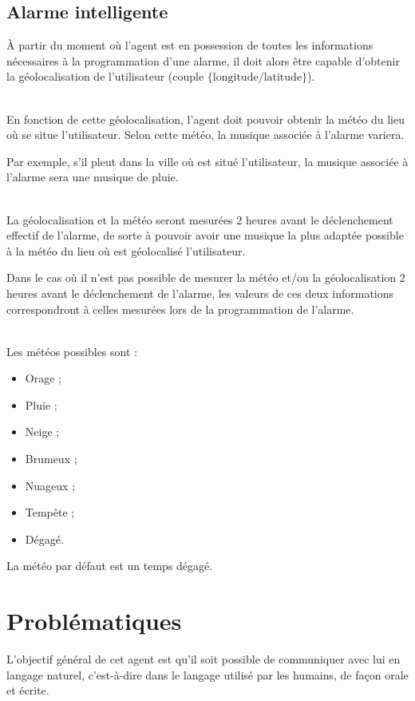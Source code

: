 \subsection{Alarme intelligente}
\`A partir du moment où l'agent est en possession de toutes les informations nécessaires à la programmation d'une alarme, il doit alors être capable d'obtenir la géolocalisation de l'utilisateur (couple $\{\text{longitude} / \text{latitude} \}$). 

~\\\indent 
En fonction de cette géolocalisation, l'agent doit pouvoir obtenir la météo du lieu où se situe l'utilisateur. Selon cette météo, la musique associée à l'alarme variera. 

Par exemple, s'il pleut dans la ville où est situé l'utilisateur, la musique associée à l'alarme sera une musique de pluie.

~\\\indent
La géolocalisation et la météo seront mesurées 2 heures avant le déclenchement effectif de l'alarme, de sorte à pouvoir avoir une musique la plus adaptée possible à la météo du lieu où est géolocalisé l'utilisateur.

Dans le cas où il n'est pas possible de mesurer la météo et/ou la géolocalisation 2 heures avant le déclenchement de l'alarme, les valeurs de ces deux informations correspondront à celles mesurées lors de la programmation de l'alarme.

~\\\indent
Les météos possibles sont : 
\begin{itemize}
    \item Orage ;
    \item Pluie ;
    \item Neige ;
    \item Brumeux ;
    \item Nuageux ;
    \item Tempête ;
    \item Dégagé.
\end{itemize}

La météo par défaut est un temps dégagé.


\section{Problématiques}
L'objectif général de cet agent est qu'il soit possible de communiquer avec lui en langage naturel, c'est-à-dire dans le langage utilisé par les humains, de façon orale et écrite. 

